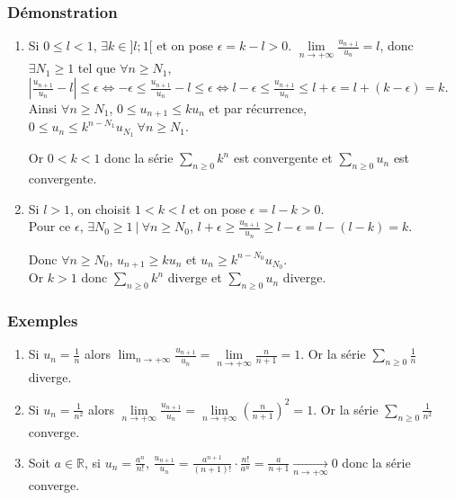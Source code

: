 \documentclass[a4paper,10pt]{book} %
\newcommand{\R}{\mathbb{R}}
\newcommand{\abs}[1]{\left|#1\right|}
\newcommand{\tq}{~|~}
\begin{document}
\subsubsection{Démonstration}
\begin{enumerate}
\item Si $0\leq l<1$, $\exists k\in ]l;1[$ et on pose $\epsilon=k-l>0$.
$\lim\limits_{n\rightarrow+\infty}\frac{u_{n+1}}{u_n}=l$, donc $\exists N_1\geq 1$ tel que $\forall n\geq N_1$, $\abs{\frac{u_{n+1}}{u_n}-l}\leq \epsilon\Leftrightarrow-\epsilon \leq \frac{u_{n+1}}{u_n}-l\leq \epsilon \Leftrightarrow l-\epsilon\leq \frac{u_{n+1}}{u_n}\leq l+\epsilon=l+(k-\epsilon)=k$.\\

Ainsi $\forall n\geq N_1$, $0\leq u_{n+1}\leq ku_n$ et par récurrence, $0\leq u_n\leq k^{n-N_1}u_{N_1}~\forall n\geq N_1$.

Or $0< k <1$ donc la série $\sum_{n\geq 0}k^n$ est convergente et $\sum_{n\geq 0}u_n$ est convergente.\smallskip

\item Si $l>1$, on choisit $1<k<l$ et on pose $\epsilon=l-k>0$.\\
Pour ce $\epsilon$, $\exists N_0\geq 1 \tq \forall n\geq N_0$, $l+\epsilon\geq \frac{u_{n+1}}{u_n}\geq l-\epsilon=l-(l-k)=k$.\smallskip

Donc $\forall n\geq N_0$, $u_{n+1}\geq ku_{n}$ et $u_n\geq k^{n-N_0}u_{N_0}$.\\
Or $k>1$ donc $\sum_{n\geq 0}k^n$ diverge et $\sum_{n\geq 0}u_n$ diverge.
\end{enumerate}

\subsubsection{Exemples}
\begin{enumerate}
\item Si $u_n=\frac{1}{n}$ alors $\lim_{n\rightarrow +\infty} \frac{u_{n+1}}{u_n}=\lim\limits_{n\rightarrow +\infty} \frac{n}{n+1}=1$.
Or la série $\sum_{n\geq 0}\frac{1}{n}$ diverge.

\item Si $u_n=\frac{1}{n^2}$ alors $\lim\limits_{n\rightarrow +\infty}\frac{u_{n+1}}{u_n}=\lim\limits_{n\rightarrow +\infty}(\frac{n}{n+1})^2=1$.
Or la série $\sum_{n\geq 0}\frac{1}{n^2}$ converge.

\item Soit $a\in\R$, si $u_n=\frac{a^n}{n!}$, 
$\frac{u_{n+1}}{u_n}=\frac{a^{n+1}}{(n+1)!}\cdot\frac{n!}{a^n}=\frac{a}{n+1}\underset{n\rightarrow +\infty}{\rightarrow} 0$ donc la série converge.
\end{enumerate}
\end{document}
